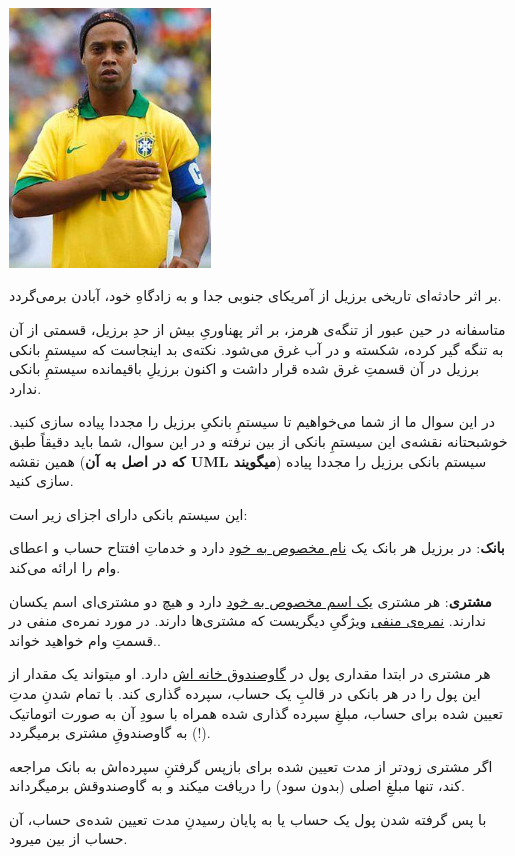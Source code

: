 \documentclass[]{article}
\begin{document}
\begin{center}
\includegraphics[width=0.4\textwidth]{ronald.jpg}
\end{center}

بر اثر حادثه‌ای تاریخی برزیل از آمریکای جنوبی جدا و به زادگاهِ خود، آبادن برمی‌گردد.

متاسفانه در حین عبور از تنگه‌ی هرمز، بر اثر پهناوریِ بیش از حدِ برزیل، قسمتی از آن به تنگه گیر کرده، شکسته و در آب غرق می‌شود. نکته‌ی بد اینجاست که سیستمِ بانکی برزیل در آن قسمتِ غرق شده قرار داشت و اکنون برزیلِ باقیمانده سیستمِ بانکی ندارد.

در این سوال ما از شما می‌خواهیم تا سیستمِ بانکیِ برزیل را مجددا پیاده سازی کنید. خوشبحتانه نقشه‌ی این سیستمِ بانکی از بین نرفته و در این سوال، شما باید دقیقاً طبق همین نقشه (\textbf{که در اصل به آن UML میگویند}) سیستم بانکی برزیل را مجددا پیاده سازی کنید.

این سیستم بانکی دارای اجزای زیر است:

\textbf{بانک}: در برزیل هر بانک یک \underline{نام مخصوص به خود} دارد و خدماتِ افتتاح حساب و اعطای وام را ارائه می‌کند.


\textbf{مشتری}: هر مشتری \underline{یک اسم مخصوص به خود} دارد و هیچ دو مشتری‌ای اسم یکسان ندارند. \underline{نمره‌ی منفی} ویژگیِ دیگریست که مشتری‌ها دارند. در مورد نمره‌ی منفی در قسمتِ وام خواهید خواند..

هر مشتری در ابتدا مقداری پول در \underline{گاوصندوق خانه اش} دارد. او میتواند یک مقدار از این پول را در هر بانکی در قالبِ یک حساب، سپرده گذاری کند. با تمام شدنِ مدتِ تعیین شده برای حساب، مبلغِ سپرده گذاری شده همراه با سودِ آن به صورت اتوماتیک (!) به گاوصندوقِ مشتری برمیگردد.

اگر مشتری زودتر از مدت تعیین شده برای بازپس گرفتنِ سپرده‌اش به بانک مراجعه کند، تنها مبلغِ اصلی (بدون سود) را دریافت میکند و به گاوصندوقش برمیگرداند.

با پس گرفته شدن پول یک حساب یا به پایان رسیدنِ مدت تعیین شده‌ی حساب، آن حساب از بین میرود.
\end{document}

